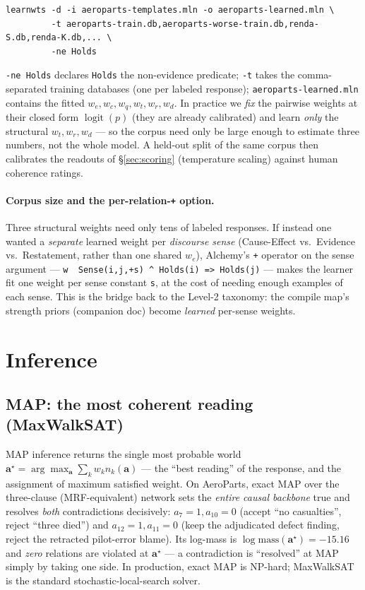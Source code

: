 \documentclass[11pt]{article}
\begin{document}
\begin{lstlisting}[style=mln]
learnwts -d -i aeroparts-templates.mln -o aeroparts-learned.mln \
         -t aeroparts-train.db,aeroparts-worse-train.db,renda-S.db,renda-K.db,... \
         -ne Holds
\end{lstlisting}

\noindent \texttt{-ne Holds} declares \texttt{Holds} the non-evidence predicate;
\texttt{-t} takes the comma-separated training databases (one per labeled response);
\texttt{aeroparts-learned.mln} contains the fitted $w_e,w_c,w_q,w_t,w_r,w_d$. In practice we
\emph{fix} the pairwise weights at their closed form $\operatorname{logit}(p)$ (they are
already calibrated) and learn \emph{only} the structural $w_t,w_r,w_d$ --- so the corpus need
only be large enough to estimate three numbers, not the whole model. A held-out split of the
same corpus then calibrates the readouts of \S\ref{sec:scoring} (temperature scaling) against
human coherence ratings.

\paragraph{Corpus size and the per-relation-\texttt{+} option.} Three structural weights need
only tens of labeled responses. If instead one wanted a \emph{separate} learned weight per
\emph{discourse sense} (Cause-Effect vs.\ Evidence vs.\ Restatement, rather than one shared
$w_e$), Alchemy's \texttt{+} operator on the sense argument
--- \lstinline[style=mln]!w  Sense(i,j,+s) ^ Holds(i) => Holds(j)! --- makes the learner fit
one weight per sense constant \texttt{s}, at the cost of needing enough examples of each
sense. This is the bridge back to the Level-2 taxonomy: the compile map's strength priors
(companion doc) become \emph{learned} per-sense weights.

\section{Inference}
\label{sec:infer}

\subsection{MAP: the most coherent reading (MaxWalkSAT)}
MAP inference returns the single most probable world
$\mathbf a^\star=\arg\max_{\mathbf a}\sum_k w_k n_k(\mathbf a)$ --- the ``best reading'' of
the response, and the assignment of maximum satisfied weight. On AeroParts, exact MAP over
the three-clause (MRF-equivalent) network sets the \emph{entire causal backbone} true and
resolves \emph{both} contradictions decisively: $a_7{=}1,a_{10}{=}0$ (accept ``no
casualties'', reject ``three died'') and $a_{12}{=}1,a_{11}{=}0$ (keep the adjudicated defect
finding, reject the retracted pilot-error blame). Its log-mass is $\log\mathrm{mass}(\mathbf
a^\star)=-15.16$ and \emph{zero} relations are violated at $\mathbf a^\star$ --- a
contradiction is ``resolved'' at MAP simply by taking one side. In production, exact MAP is
NP-hard; MaxWalkSAT \citep{mln} is the standard stochastic-local-search solver.
\end{document}
